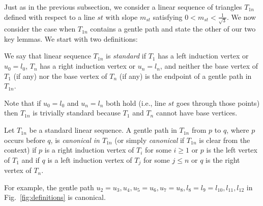 Just as in the previous subsection, we consider a linear sequence of triangles
$T_{1n}$ defined with respect to a line $st$ with slope $m_{st}$ satisfying
$0 < m_{st} < \frac{1}{\sqrt{3}}$. We now consider the case when $T_{1n}$
contains a gentle path and state the other of our two key lemmas. We start 
with two definitions:
\begin{definition}
We say that linear sequence $T_{1n}$ is {\em standard}
if $T_1$ has a left induction vertex or $u_0=l_0$, $T_n$ has a right induction
vertex or $u_n=l_n$, and neither the base vertex of $T_1$ (if any) nor the base
vertex of $T_n$ (if any) is the endpoint of a gentle path in $T_{1n}$. 
\end{definition}
Note that if $u_0=l_0$ and $u_n=l_n$ both hold (i.e., line $st$ goes through
those points) then $T_{1n}$ is trivially standard because $T_1$ and $T_n$
cannot  have base vertices. %

\begin{definition}
Let $T_{1n}$ be a standard linear sequence.
A gentle path in $T_{1n}$ from $p$ to $q$, where $p$ occurs before $q$, is
{\em canonical in $T_{1n}$} (or simply {\em canonical} if $T_{1n}$ is clear
from the context) if $p$ is a right induction vertex of $T_{i}$ for some
$i \geq 1$  or $p$ is the left vertex of $T_1$ and if $q$ is a left induction
vertex of $T_{j}$ for some $j \leq n$ or $q$ is the right vertex of $T_n$.
\end{definition}
For example, the gentle path 
$u_2=u_3,u_4,u_5=u_6,u_7=u_8,l_8=l_9=l_{10},l_{11},l_{12}$
in Fig.~\ref{fig:definitions} is canonical.



